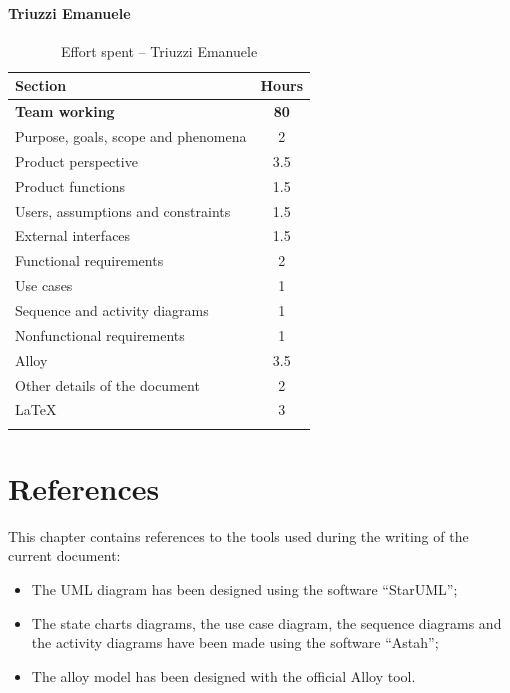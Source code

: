 \documentclass[a4paper,oneside,11pt]{book}   %
\begin{document}
    \subsubsection{Triuzzi Emanuele}
    \begin{longtable}[c]{|H{.55\textwidth}|c|}
        \hline
        \textbf{Section} & {\bfseries{Hours}} \\ \hline
        \textbf{Team working} & \textbf{80} \\ \hline
        Purpose, goals, scope and phenomena & 2 \\ \hline
        Product perspective & 3.5 \\ \hline
        Product functions & 1.5 \\ \hline
        Users, assumptions and constraints & 1.5 \\ \hline
        External interfaces & 1.5 \\ \hline
        Functional requirements & 2 \\ \hline
        Use cases & 1 \\ \hline
        Sequence and activity diagrams & 1 \\ \hline
        Nonfunctional requirements & 1 \\ \hline
        Alloy & 3.5 \\ \hline
        Other details of the document & 2 \\ \hline
        \LaTeX & 3 \\
        \hline
        \caption{Effort spent -- Triuzzi Emanuele}
        \label{table:effort_triuzzi}
    \end{longtable}
    
    \chapter{References}
    This chapter contains references to the tools used during the writing of the current document:
    \begin{itemize}
        \item The UML diagram has been designed using the software “StarUML”;
        \item The state charts diagrams, the use case diagram, the sequence diagrams and the activity diagrams have been made using the software “Astah”;
        \item The alloy model has been designed with the official Alloy tool.
    \end{itemize}

\listoftables
\listoffigures
\end{document}
